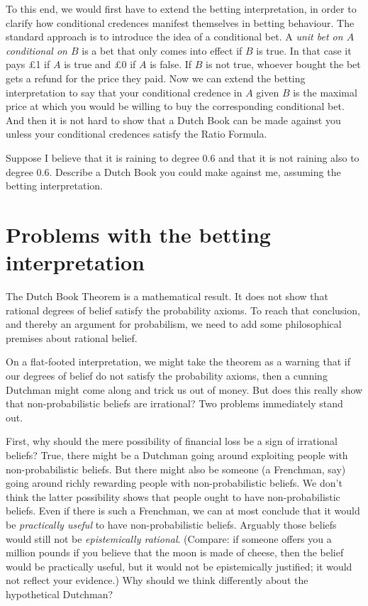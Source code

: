 To this end, we would first have to extend the betting interpretation,
in order to clarify how conditional credences manifest themselves in
betting behaviour. The standard approach is to introduce the idea of a
conditional bet. A \emph{unit bet on $A$ conditional on $B$} is a bet
that only comes into effect if $B$ is true. In that case it pays £1 if
$A$ is true and £0 if $A$ is false. If $B$ is not true, whoever bought
the bet gets a refund for the price they paid. Now we can extend the
betting interpretation to say that your conditional credence in $A$
given $B$ is the maximal price at which you would be willing to buy the
corresponding conditional bet. And then it is not hard to show that a
Dutch Book can be made against you unless your conditional credences
satisfy the Ratio Formula.


\begin{exercise3}
  Suppose I believe that it is raining to degree 0.6 and that it is
  not raining also to degree 0.6. Describe a Dutch Book you could make
  against me, assuming the betting interpretation.
\end{exercise3}

\section{Problems with the betting interpretation}\label{sec:problem-betting}

The Dutch Book Theorem is a mathematical result. It does not show that
rational degrees of belief satisfy the probability axioms. To reach
that conclusion, and thereby an argument for probabilism, we need to
add some philosophical premises about rational belief.

On a flat-footed interpretation, we might take the theorem as a
warning that if our degrees of belief do not satisfy the probability
axioms, then a cunning Dutchman might come along and trick us out of
money. But does this really show that non-probabilistic beliefs are
irrational? Two problems immediately stand out.

First, why should the mere possibility of financial loss be a sign of
irrational beliefs? True, there might be a Dutchman going around
exploiting people with non-probabilistic beliefs. But there might also
be someone (a Frenchman, say) going around richly rewarding people
with non-probabilistic beliefs. We don't think the latter possibility
shows that people ought to have non-probabilistic beliefs. Even if
there is such a Frenchman, we can at most conclude that it would be
\emph{practically useful} to have non-probabilistic beliefs. Arguably
those beliefs would still not be \emph{epistemically
  rational}. (Compare: if someone offers you a million pounds if you
believe that the moon is made of cheese, then the belief would be
practically useful, but it would not be epistemically justified;
it would not reflect your evidence.) Why should we think
differently about the hypothetical Dutchman? 

